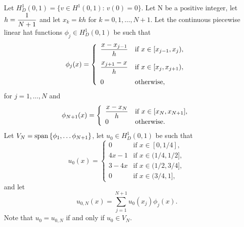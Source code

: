 
Let $H^1_D\left(0,1\right)=\{v\in H^1\left(0,1\right):\,v(0)=0\}$. Let N be a positive integer, let $\displaystyle{h={1 \over N+1}}$ and let $x_k=kh$ for $k=0,1,\ldots,N+1$. Let the continuous piecewise linear hat functions $\phi_j\in H^1_D(0,1)$ be such that
\[
\phi_j(x) = \left\{\begin{array}{ll}
\displaystyle{{x-x_{j-1} \over h}} & \displaystyle{\mbox{if }x\in[x_{j-1},x_j)},
\\[10pt]
\displaystyle{{x_{j+1}-x \over h}} & \displaystyle{\mbox{if }x\in[x_j,x_{j+1})},
\\[10pt]
0 & \mbox{otherwise},
\end{array}\right.
\]
for $j=1,\ldots,N$ and
\[
\phi_{N+1}(x) = \left\{\begin{array}{ll}
\displaystyle{x-x_N \over h} & \mbox{if }x\in[x_N,x_{N+1}],\\
0& \mbox{otherwise.}
\end{array}\right.
\]
Let $V_N={\rm span}\left\{\phi_1,\ldots\phi_{N+1}\right\}$, let $u_0\in H^1_D(0,1)$ be such that
\[
u_0(x)=\left\{\begin{array}{ll}
0 & \mbox{if }x\in[0,1/4],\\
4x-1 & \mbox{if }x\in(1/4,1/2],\\
3-4x & \mbox{if }x\in(1/2,3/4],\\
0 & \mbox{if }x\in(3/4,1],
\end{array}\right.
\]
and let
\[
u_{0,N}(x)=\sum_{j=1}^{N+1}u_0(x_j)\phi_j(x).
\]
Note that $u_0=u_{0,N}$ if and only if $u_0\in V_N$.
\\
